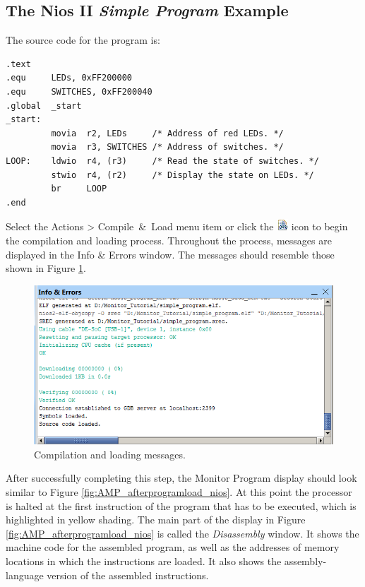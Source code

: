 \documentclass[11pt, twoside, pdftex]{article}
\begin{document}
\subsection{The Nios II {\it Simple Program} Example}
\label{tut:nios_2}

The source code for the program is:
\begin{lstlisting}[style=defaultNiosStyle, xleftmargin=3cm]
.text
.equ     LEDs, 0xFF200000
.equ     SWITCHES, 0xFF200040
.global  _start
_start:
         movia  r2, LEDs     /* Address of red LEDs. */
         movia  r3, SWITCHES /* Address of switches. */
LOOP:    ldwio  r4, (r3)     /* Read the state of switches. */
         stwio  r4, (r2)     /* Display the state on LEDs. */
         br     LOOP
.end
\end{lstlisting}
Select the \textsf{Actions > Compile~\&~Load} menu item
or click the \includegraphics{toolbar/compile_load.png} icon to
begin the compilation and loading process.  
Throughout the process, messages are displayed in 
the \textsf{Info \& Errors} window. The messages should resemble
those shown in Figure \ref{fig:AMP_compilationmessages_nios}.

\begin{figure}[H]
   \begin{center}
      \includegraphics[scale=1]{screenshots/figure14.png}
   \end{center}
   \caption{Compilation and loading messages.} 
   \label{fig:AMP_compilationmessages_nios}
\end{figure}

After successfully completing this step, the Monitor Program display should look similar to Figure \ref{fig:AMP_afterprogramload_nios}. At this point the
processor is halted at the first instruction of the program that
has to be executed, which is highlighted in yellow shading.
The main part of the display in Figure \ref{fig:AMP_afterprogramload_nios} is called the
{\it Disassembly} window. 
It shows the machine code for the assembled program,
as well as the addresses of memory locations in which the
instructions are loaded. It also shows the assembly-language
version of the assembled instructions.
\end{document}
